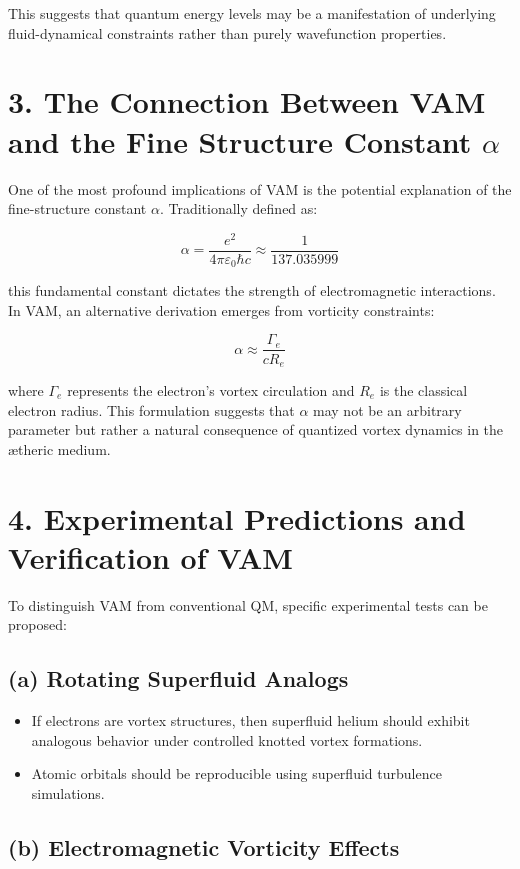 \documentclass[a4paper,10pt]{article}
\begin{document}
This suggests that quantum energy levels may be a manifestation of underlying fluid-dynamical constraints rather than purely wavefunction properties.

\section*{3. The Connection Between VAM and the Fine Structure Constant \(\alpha\)}

One of the most profound implications of VAM is the potential explanation of the fine-structure constant \(\alpha\). Traditionally defined as:

\[
    \alpha = \frac{e^2}{4\pi \varepsilon_0 \hbar c} \approx \frac{1}{137.035999}
\]

this fundamental constant dictates the strength of electromagnetic interactions. In VAM, an alternative derivation emerges from vorticity constraints:

\[
    \alpha \approx \frac{\Gamma_e}{c R_e}
\]

where \(\Gamma_e\) represents the electron's vortex circulation and \(R_e\) is the classical electron radius. This formulation suggests that \(\alpha\) may not be an arbitrary parameter but rather a natural consequence of quantized vortex dynamics in the ætheric medium.

\section*{4. Experimental Predictions and Verification of VAM}

To distinguish VAM from conventional QM, specific experimental tests can be proposed:

\subsection*{(a) Rotating Superfluid Analogs}

\begin{itemize}
    \item If electrons are vortex structures, then superfluid helium should exhibit analogous behavior under controlled knotted vortex formations.
    \item Atomic orbitals should be reproducible using superfluid turbulence simulations.
\end{itemize}

\subsection*{(b) Electromagnetic Vorticity Effects}
\end{document}
